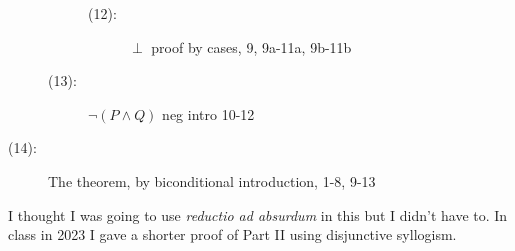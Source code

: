 \documentclass[12pt]{article}
\begin{document}
\begin{description}
\begin{description}
\begin{description}
\item[(12):]  $\perp$ proof by cases, 9, 9a-11a, 9b-11b

\end{description}

\item[(13):]  $\neg(P \wedge Q)$  neg intro 10-12

\end{description}

\item[(14):]  The theorem, by biconditional introduction, 1-8, 9-13

\end{description}

I thought I was going to use {\em reductio ad absurdum\/} in this but I didn't have to.  In class in 2023 I gave a shorter proof of Part II using disjunctive syllogism.

\newpage
\end{document}
